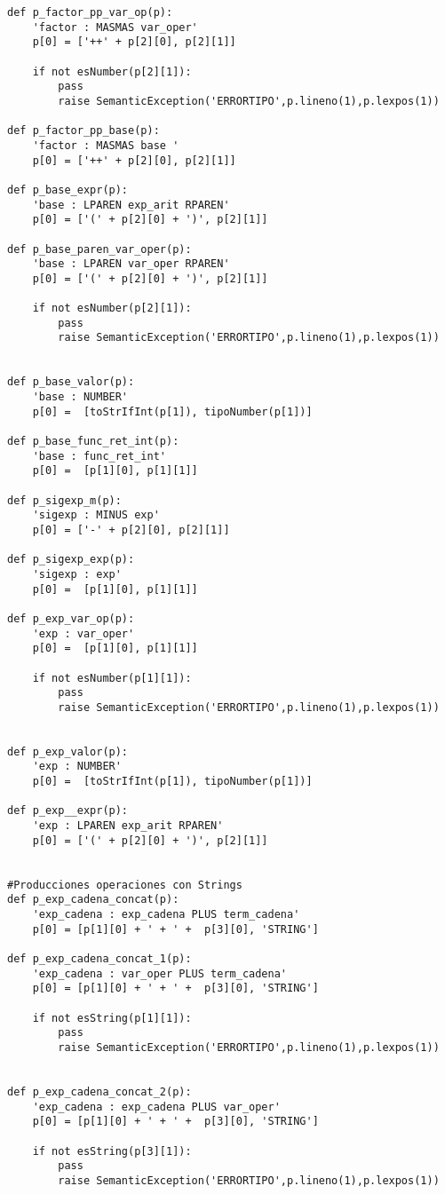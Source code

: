 \begin{verbatim}
def p_factor_pp_var_op(p):
    'factor : MASMAS var_oper'
    p[0] = ['++' + p[2][0], p[2][1]]

    if not esNumber(p[2][1]):
        pass
        raise SemanticException('ERRORTIPO',p.lineno(1),p.lexpos(1))

def p_factor_pp_base(p):
    'factor : MASMAS base '
    p[0] = ['++' + p[2][0], p[2][1]]

def p_base_expr(p):
    'base : LPAREN exp_arit RPAREN'
    p[0] = ['(' + p[2][0] + ')', p[2][1]]

def p_base_paren_var_oper(p):
    'base : LPAREN var_oper RPAREN'
    p[0] = ['(' + p[2][0] + ')', p[2][1]]

    if not esNumber(p[2][1]):
        pass
        raise SemanticException('ERRORTIPO',p.lineno(1),p.lexpos(1))


def p_base_valor(p):
    'base : NUMBER'
    p[0] =  [toStrIfInt(p[1]), tipoNumber(p[1])] 

def p_base_func_ret_int(p):
    'base : func_ret_int'
    p[0] =  [p[1][0], p[1][1]] 

def p_sigexp_m(p):
    'sigexp : MINUS exp'
    p[0] = ['-' + p[2][0], p[2][1]]

def p_sigexp_exp(p):
    'sigexp : exp'
    p[0] =  [p[1][0], p[1][1]]

def p_exp_var_op(p):
    'exp : var_oper'
    p[0] =  [p[1][0], p[1][1]]

    if not esNumber(p[1][1]):
        pass
        raise SemanticException('ERRORTIPO',p.lineno(1),p.lexpos(1))


def p_exp_valor(p):
    'exp : NUMBER'
    p[0] =  [toStrIfInt(p[1]), tipoNumber(p[1])]

def p_exp__expr(p):
    'exp : LPAREN exp_arit RPAREN'
    p[0] = ['(' + p[2][0] + ')', p[2][1]]


#Producciones operaciones con Strings
def p_exp_cadena_concat(p):
    'exp_cadena : exp_cadena PLUS term_cadena'
    p[0] = [p[1][0] + ' + ' +  p[3][0], 'STRING']

def p_exp_cadena_concat_1(p):
    'exp_cadena : var_oper PLUS term_cadena'
    p[0] = [p[1][0] + ' + ' +  p[3][0], 'STRING']

    if not esString(p[1][1]):
        pass
        raise SemanticException('ERRORTIPO',p.lineno(1),p.lexpos(1))


def p_exp_cadena_concat_2(p):
    'exp_cadena : exp_cadena PLUS var_oper'
    p[0] = [p[1][0] + ' + ' +  p[3][0], 'STRING']

    if not esString(p[3][1]):
        pass
        raise SemanticException('ERRORTIPO',p.lineno(1),p.lexpos(1))



\end{verbatim}
